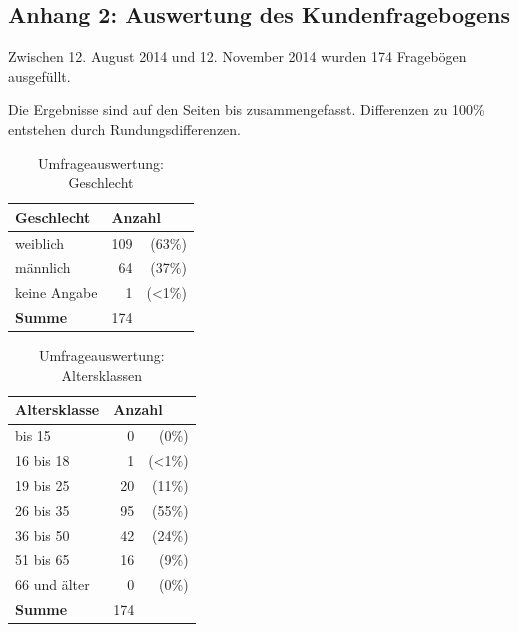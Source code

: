 \newpage
\subsection*{Anhang 2: Auswertung des Kundenfragebogens}

Zwischen 12. August 2014 und 12. November 2014 wurden 174 Fragebögen ausgefüllt. 

Die Ergebnisse sind auf den Seiten \pageref{tab:geschlecht} bis \pageref{tab:usability} zusammengefasst. Differenzen zu 100\% entstehen durch Rundungsdifferenzen.

\begin{table}[H]
\begin{center}
\begin{footnotesize}
\begin{tabular}{| l | r  r |}  \hline                       
  \textbf{Geschlecht}              & \multicolumn{2}{|l|}{\textbf{Anzahl}}   \\ \hline 
  weiblich        &  109 &   (63\%)  \\  \hline  
  männlich        &  64  &   (37\%)  \\  \hline  
  keine Angabe    &  1   &   (<1\%)  \\  \hline  
  \textbf{Summe}  & 174  &   \\  \hline  
\end{tabular}
\end{footnotesize}
\caption{Umfrageauswertung: Geschlecht}
\label{tab:geschlecht}
\end{center}
\end{table}

\begin{table}[H]
\begin{center}
\begin{footnotesize}
\begin{tabular}{| l | r  r |}  \hline                       
  \textbf{Altersklasse}              & \multicolumn{2}{|l|}{\textbf{Anzahl}}   \\ \hline 
  bis 15          &  0 &   (0\%)  \\  \hline  
  16 bis 18       &  1 &   (<1\%)  \\  \hline  
  19 bis 25       & 20  &   (11\%)  \\  \hline  
  26 bis 35       & 95  &   (55\%)  \\  \hline  
  36 bis 50       & 42  &   (24\%)  \\  \hline  
  51 bis 65       & 16  &   (9\%)  \\  \hline  
  66 und älter    & 0  &   (0\%)  \\  \hline  
  \textbf{Summe}  & 174  &   \\  \hline  
\end{tabular}
\end{footnotesize}
\caption{Umfrageauswertung: Altersklassen}
\label{tab:altersklassen}
\end{center}
\end{table}

